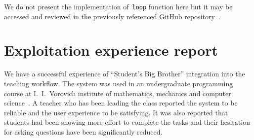 We do not present the implementation of~\lstinline{loop} function here but it
may be accessed and reviewed in the previously referenced GitHub
repository~\cite{sbbRepo}.

\section{Exploitation experience report}

We have a successful experience of ``Student's Big Brother'' integration into
the teaching workflow. The system was used in an undergraduate programming course
at I.~I.~Vorovich institute of mathematics, mechanics and computer
science~\cite{fiit}. A teacher who has been leading the
class reported the system to be reliable and the user experience to be satisfying.
It was also reported that students had been showing more effort to complete the
tasks and their hesitation for asking questions have been significantly reduced.
